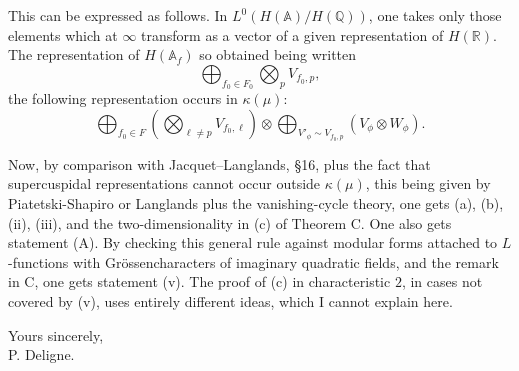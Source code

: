 \documentclass[11pt]{article}
\newcommand{\Q}{\mathbb{Q}}
\newcommand{\Af}{\mathbb{A}_{f}}
\begin{document}
This can be expressed as follows. In \(L^0(H(\mathbb A)/H(\Q))\), one takes only those elements which at \(\infty\) transform as a vector of a given representation of \(H(\mathbb R)\). The representation of \(H(\Af)\) so obtained being written
\[
\bigoplus_{f_0\in F_0}\bigotimes_p V_{f_0,p},
\]
the following representation occurs in \(\kappa(\mu)\):
\[
\bigoplus_{f_0\in F}
\left(\bigotimes_{\ell\neq p}V_{f_0,\ell}\right)
\otimes
\bigoplus_{V'_{\phi}\sim V_{f_0,p}}
(V_{\phi}\otimes W_{\phi}).
\]

Now, by comparison with Jacquet--Langlands, \S 16, plus the fact that supercuspidal representations cannot occur outside \(\kappa(\mu)\), this being given by Piatetski-Shapiro or Langlands plus the vanishing-cycle theory, one gets (a), (b), (ii), (iii), and the two-dimensionality in (c) of Theorem C. One also gets statement (A). By checking this general rule against modular forms attached to \(L\)-functions with Grössencharacters of imaginary quadratic fields, and the remark in C, one gets statement (v). The proof of (c) in characteristic \(2\), in cases not covered by (v), uses entirely different ideas, which I cannot explain here.

\begin{flushright}
Yours sincerely,\\[1.5em]
P. Deligne.
\end{flushright}
\end{document}
